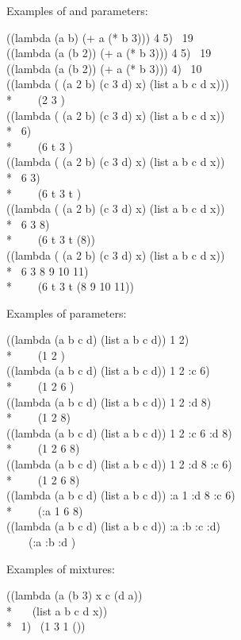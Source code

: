 \noindent
Examples of  and  parameters:
\begin{lisp}
((lambda (a b) (+ a (* b 3))) 4 5) \EV\ 19 \\
((lambda (a  (b 2)) (+ a (* b 3))) 4 5) \EV\ 19 \\
((lambda (a  (b 2)) (+ a (* b 3))) 4) \EV\ 10 \\
((lambda ( (a 2 b) (c 3 d)  x) (list a b c d x))) \\*
~~~\EV\ (2 {\false} 3 {\false} {\false}) \\
((lambda ( (a 2 b) (c 3 d)  x) (list a b c d x)) \\*
~6) \\*
~~~\EV\ (6 t 3 {\false} {\false}) \\
((lambda ( (a 2 b) (c 3 d)  x) (list a b c d x)) \\*
~6 3) \\*
~~~\EV\ (6 t 3 t {\false}) \\
((lambda ( (a 2 b) (c 3 d)  x) (list a b c d x)) \\*
~6 3 8) \\*
~~~\EV\ (6 t 3 t (8)) \\
((lambda ( (a 2 b) (c 3 d)  x) (list a b c d x)) \\*
~6 3 8 9 10 11) \\*
~~~\EV\ (6 t 3 t (8 9 10 11))
\end{lisp}
Examples of  parameters:
\begin{lisp}
((lambda (a b  c d) (list a b c d)) 1 2) \\*
~~~\EV\ (1 2 {\nil} {\nil}) \\
((lambda (a b  c d) (list a b c d)) 1 2 :c 6) \\*
~~~\EV\ (1 2 6 {\nil}) \\
((lambda (a b  c d) (list a b c d)) 1 2 :d 8) \\*
~~~\EV\ (1 2 {\nil} 8) \\
((lambda (a b  c d) (list a b c d)) 1 2 :c 6 :d 8) \\*
~~~\EV\ (1 2 6 8) \\
((lambda (a b  c d) (list a b c d)) 1 2 :d 8 :c 6) \\*
~~~\EV\ (1 2 6 8) \\
((lambda (a b  c d) (list a b c d)) :a 1 :d 8 :c 6) \\*
~~~\EV\ (:a 1 6 8) \\
((lambda (a b  c d) (list a b c d)) :a :b :c :d) \\
~~~\EV\ (:a :b :d {\nil})
\end{lisp}
Examples of mixtures:
\begin{lisp}
((lambda (a  (b 3)  x  c (d a)) \\*
~~~(list a b c d x)) \\*
~1)   \EV\ (1 3 {\nil} 1 ())
\end{lisp}

